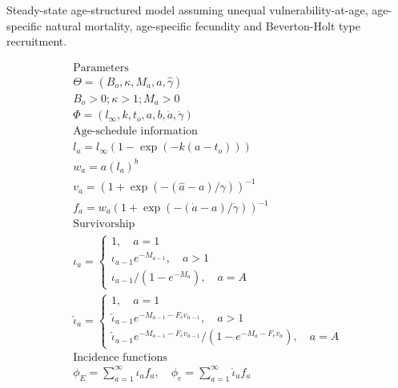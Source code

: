 \begin{table}[!tbp]
\caption{Steady-state age-structured model assuming unequal
vulnerability-at-age, age-specific natural mortality, age-specific
fecundity and Beverton-Holt type recruitment.}\label{Table2} 
\tableEq
    \begin{gather}
           \hline
        \mbox{Parameters} \nonumber \\
            \Theta = (B_o,\kappa,M_a,\hat{a},\hat{\gamma}) \label{T2.1}\\
            B_o>0; \kappa > 1; M_a > 0\\
            \Phi = (l_\infty, k, t_o,a,b,\dot{a},\dot{\gamma}) \label{T2.3}\\[1ex]
        \mbox{Age-schedule information} \nonumber\\
            l_a=l_\infty(1-\exp(-k(a-t_o)))\label{T2.4}\\
            w_a=a(l_a)^b \label{T2.5}\\
            v_a=(1+\exp(-(\hat{a}-a)/\gamma))^{-1} \label{T2.6}\\
            f_a=w_a(1+\exp(-(\dot{a}-a)/\dot{\gamma}))^{-1} \label{T2.7}\\[1ex]
        \mbox{Survivorship} \nonumber\\
            \iota_a=\begin{cases} 1, \quad a=1      \label{T2.8} \\
            \iota_{a-1}e^{-M_{a-1}},\quad a>1\\
            \iota_{a-1}/(1-e^{-M_a}),\quad a=A \end{cases}\\
            \hat{\iota}_a=\begin{cases} 1, \quad a=1\\
            \hat{\iota}_{a-1}e^{-M_{a-1}-F_e v_{a-1}},\quad a>1\\
            \hat{\iota}_{a-1}e^{-M_{a-1}-F_e v_{a-1}}/(1-e^{-M_{a}-F_e v_{a}}),\quad a=A
            \end{cases} \label{T2.9}\\[1ex]
        \mbox{Incidence functions} \nonumber \\
            \phi_E=\sum_{a=1}^\infty \iota_a f_a, \quad
            \phi_e=\sum_{a=1}^\infty \hat{\iota}_a f_a \label{T2.10}\\

\end{gather}
\end{table}
